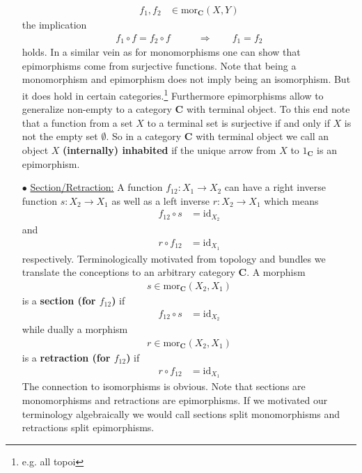 \begin{exa}
\begin{enumerate}
\begin{align*}
  f_{1},
  f_{2}
  &\in
  \mathrm{mor}_{\mathbf{C}}(X,Y)
\end{align*}
the implication
\begin{align*}
  f_{1}
  \circ
  f
  =
  f_{2}
  \circ
  f
  \qquad
  &\Rightarrow
  \qquad
  f_{1}
  =
  f_{2}
\end{align*}
holds. In a similar vein as for monomorphisms one can show that epimorphisms come from surjective functions. Note that being a monomorphism and epimorphism does not imply being an isomorphism. But it does hold in certain categories.\footnote{e.g. all topoi} Furthermore epimorphisms allow to generalize {\glqq}non-empty{\grqq} to a category $\mathbf{C}$ with terminal object. To this end note that a function from a set $X$ to a terminal set is surjective if and only if $X$ is not the empty set $\emptyset$. So in a category $\mathbf{C}$ with terminal object we call an object $X$ \textbf{(internally) inhabited} if the unique arrow from $X$ to $1_{\mathbf{C}}$ is an epimorphism.
\item[$\bullet$]
\underline{Section/Retraction:}
A function $f_{12} \colon X_{1} \rightarrow X_{2}$ can have a right inverse function $s \colon X_{2} \rightarrow X_{1}$ as well as a left inverse $r \colon X_{2} \rightarrow X_{1}$ which means
\begin{align*}
  f_{12}
  \circ
  s
  &=
  \mathrm{id}_{X_{2}}
\end{align*}
and
\begin{align*}
  r
  \circ
  f_{12}
  &=
  \mathrm{id}_{X_{1}}
\end{align*}
respectively. Terminologically motivated from topology and bundles we translate the conceptions to an arbitrary category $\mathbf{C}$. A morphism
\begin{align*}
  s
  \in
  \mathrm{mor}_{\mathbf{C}}(X_{2},X_{1})
\end{align*}
is a \textbf{section (for $f_{12}$)} if
\begin{align*}
  f_{12}
  \circ
  s
  &=
  \mathrm{id}_{X_{2}}
\end{align*}
while dually a morphism
\begin{align*}
  r
  \in
  \mathrm{mor}_{\mathbf{C}}(X_{2},X_{1})
\end{align*}
is a \textbf{retraction (for $f_{12}$)} if
\begin{align*}
  r
  \circ
  f_{12}
  &=
  \mathrm{id}_{X_{1}}
\end{align*}
The connection to isomorphisms is obvious. Note that sections are monomorphisms and retractions are epimorphisms. If we motivated our terminology algebraically we would call sections split monomorphisms and retractions split epimorphisms.

\end{enumerate}
\end{exa}
